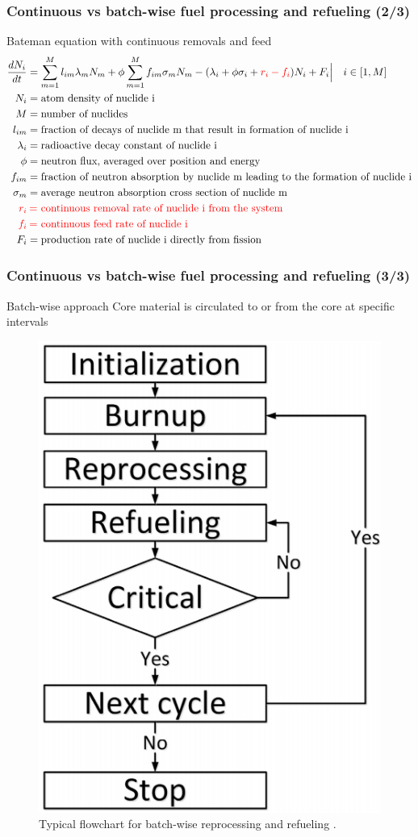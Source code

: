 \begin{frame}
\frametitle{Continuous vs batch-wise fuel processing  and refueling (2/3)}
\vspace{-1.3mm}
\begin{block}{Bateman equation with continuous removals and feed}
	\begin{align}
	\frac{dN_i}{dt} &= \sum_{m=1}^{M}l_{im}\lambda_mN_m + 
	\phi\sum_{m=1}^{M}f_{im}\sigma_mN_m - (\lambda_i + \phi\sigma_i + 
	\textcolor{red}{r_i - 
		f_i})N_i + F_i\Big|\quad{i\in [1,M]} \nonumber \\
	N_i &= \mbox{atom density of nuclide i} \nonumber \\
	M &= \mbox{number of nuclides} \nonumber \\
	l_{im} &= \mbox{fraction of decays of nuclide m that result in formation 
	of 
		nuclide i}\nonumber \\
	\lambda_i &= \mbox{radioactive decay constant of nuclide i} \nonumber \\
	\phi &= \mbox{neutron flux, averaged over position and energy} \nonumber \\
	f_{im} &= \mbox{fraction of neutron absorption by nuclide m leading to the 
		formation of nuclide i} \nonumber \\
	\sigma_m &= \mbox{average neutron absorption cross section of nuclide m} 
	\nonumber \\
	\textcolor{red}{r_i} & \mkern4mu \textcolor{red}{=} \mbox{\space 
	\textcolor{red}{continuous removal rate of nuclide i from the system}} 
	\nonumber \\
	\textcolor{red}{f_i} & \mkern4mu  \textcolor{red}{=} \mbox{\space 
	\textcolor{red}{continuous feed rate of nuclide i}} \nonumber \\
	F_i &= \mbox{production rate of nuclide i directly from fission}\nonumber
	\end{align}
\end{block}
\end{frame}


\begin{frame}
\frametitle{Continuous vs batch-wise fuel processing and refueling (3/3)}
\begin{block}{Batch-wise approach}
	Core material is circulated to or from the core at specific 
	intervals		
\end{block}
\begin{figure}[t]
	\hspace{3mm}
	\includegraphics[height=0.4\textwidth]{./images/batch-wise.png}
	\caption{Typical flowchart for batch-wise reprocessing and refueling 
		\cite{li_optimization_2018}.}
\end{figure}               
\end{frame}


